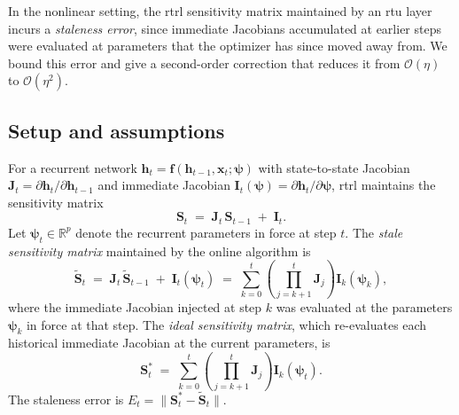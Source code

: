 \documentclass{article}
\begin{document}
In the nonlinear setting, the \gls{rtrl} sensitivity matrix maintained by an
\gls{rtu} layer incurs a \emph{staleness error}, since immediate Jacobians
accumulated at earlier steps were evaluated at parameters that the
optimizer has since moved away from. We bound this error and give a
second-order correction that reduces it from $\mathcal{O}(\eta)$ to
$\mathcal{O}(\eta^2)$.

\subsection{Setup and assumptions}
\label{sec:staleness-setup}

For a recurrent network $\boldsymbol{h}_t = \boldsymbol{f}(\boldsymbol{h}_{t-1}, \boldsymbol{x}_t; \boldsymbol{\psi})$ with state-to-state
Jacobian $\boldsymbol{J}_t = \partial \boldsymbol{h}_t / \partial \boldsymbol{h}_{t-1}$ and immediate Jacobian
$\boldsymbol{I}_t(\boldsymbol{\psi}) = \partial \boldsymbol{h}_t / \partial \boldsymbol{\psi}$, \gls{rtrl} maintains the sensitivity
matrix
\begin{equation}
    \boldsymbol{S}_t \;=\; \boldsymbol{J}_t\, \boldsymbol{S}_{t-1} \;+\; \boldsymbol{I}_t.
\end{equation}
Let $\boldsymbol{\psi}_t \in \mathbb{R}^p$ denote the recurrent parameters in force at
step $t$. The \emph{stale sensitivity matrix} maintained by the online
algorithm is
\begin{equation}
    \tilde{\boldsymbol{S}}_t \;=\; \boldsymbol{J}_t\, \tilde{\boldsymbol{S}}_{t-1} \;+\; \boldsymbol{I}_t(\boldsymbol{\psi}_t)
    \;=\; \sum_{k=0}^{t} \left(\prod_{j=k+1}^{t} \boldsymbol{J}_j\right) \boldsymbol{I}_k(\boldsymbol{\psi}_k),
\end{equation}
where the immediate Jacobian injected at step $k$ was evaluated at the
parameters $\boldsymbol{\psi}_k$ in force at that step. The \emph{ideal sensitivity
matrix}, which re-evaluates each historical immediate Jacobian at the
current parameters, is
\begin{equation}
    \boldsymbol{S}_t^\ast \;=\; \sum_{k=0}^{t} \left(\prod_{j=k+1}^{t} \boldsymbol{J}_j\right) \boldsymbol{I}_k(\boldsymbol{\psi}_t).
\end{equation}
The staleness error is $E_t = \|\boldsymbol{S}_t^\ast - \tilde{\boldsymbol{S}}_t\|$.
\end{document}
